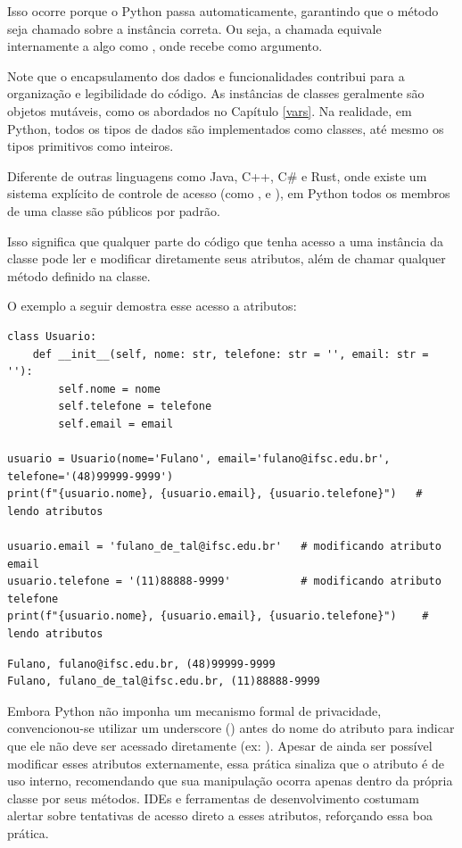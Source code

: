 Isso ocorre porque o Python passa  automaticamente, garantindo que o método seja chamado sobre a instância correta.
Ou seja, a chamada  equivale
internamente a algo como , onde  recebe
 como argumento.

Note que o encapsulamento dos dados e funcionalidades contribui para a organização e legibilidade do código.
As instâncias de classes geralmente são objetos mutáveis, como os abordados no Capítulo \ref{vars}.
Na realidade, em Python, todos os tipos de dados são implementados como classes, até mesmo os tipos primitivos como inteiros.

Diferente de outras linguagens como Java, C++, C\# e Rust, onde existe um sistema explícito de controle de
acesso (como ,  e ), em Python todos os membros
de uma classe são públicos por padrão.

Isso significa que qualquer parte do código que tenha acesso a uma instância da classe pode ler e modificar diretamente
seus atributos, além de chamar qualquer método definido na classe.

O exemplo a seguir demostra esse acesso a atributos:
\begin{verbatim}
class Usuario:
    def __init__(self, nome: str, telefone: str = '', email: str = ''):
        self.nome = nome
        self.telefone = telefone
        self.email = email

usuario = Usuario(nome='Fulano', email='fulano@ifsc.edu.br', telefone='(48)99999-9999')
print(f"{usuario.nome}, {usuario.email}, {usuario.telefone}")   # lendo atributos

usuario.email = 'fulano_de_tal@ifsc.edu.br'   # modificando atributo email
usuario.telefone = '(11)88888-9999'           # modificando atributo telefone
print(f"{usuario.nome}, {usuario.email}, {usuario.telefone}")    # lendo atributos
\end{verbatim}
\begin{verbatim}
Fulano, fulano@ifsc.edu.br, (48)99999-9999
Fulano, fulano_de_tal@ifsc.edu.br, (11)88888-9999
\end{verbatim}

Embora Python não imponha um mecanismo formal de privacidade, convencionou-se utilizar um
underscore (\inlcode{_}) antes do nome do atributo para indicar que ele
não deve ser acessado diretamente (ex: ). Apesar de ainda ser possível modificar
esses atributos externamente, essa prática sinaliza que o atributo é de uso interno, recomendando que sua manipulação
ocorra apenas dentro da própria classe por seus métodos. IDEs e ferramentas de desenvolvimento costumam alertar sobre
tentativas de acesso direto a esses atributos, reforçando essa boa prática.


